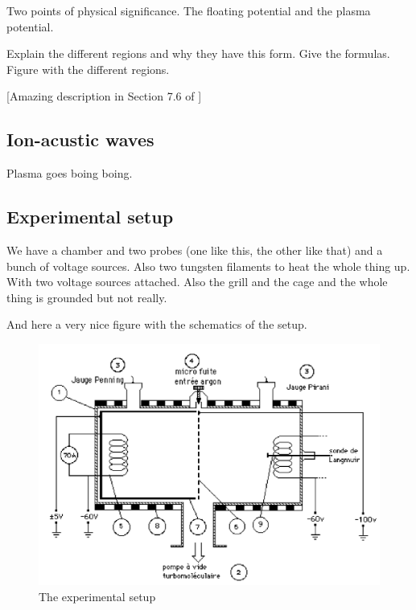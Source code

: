 Two points of physical significance.
The floating potential and the plasma potential.

Explain the different regions and why they have this form.
Give the formulas.
Figure with the different regions.

[Amazing description in Section 7.6 of \cite{piel_plasma_2017}]

\subsection{Ion-acustic waves}
Plasma goes boing boing.

\subsection{Experimental setup}
We have a chamber and two probes (one like this, the other like that) and a bunch of voltage sources.
Also two tungsten filaments to heat the whole thing up.
With two voltage sources attached.
Also the grill and the cage and the whole thing is grounded but not really.

And here a very nice figure with the schematics of the setup.
\begin{figure}
    \centering
    \includegraphics[width=12cm]{figures/experimental-setup.png}
    \caption{The experimental setup}
    \label{fig:experimental_setup}
\end{figure}